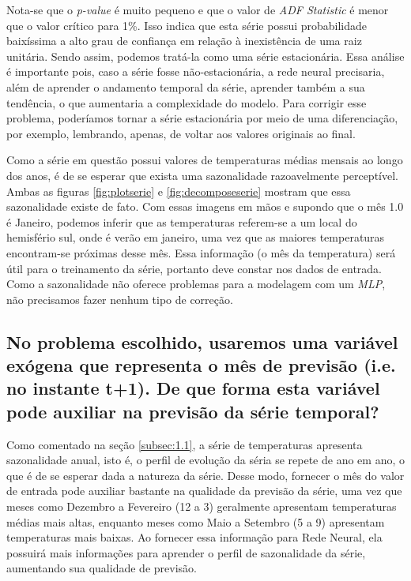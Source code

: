 \documentclass[12pt]{article}
\begin{document}
	Nota-se que o \textit{p-value} é muito pequeno e que o valor de \textit{ADF Statistic} é menor que o valor crítico para 1\%. Isso indica que esta série possui probabilidade baixíssima a alto grau de confiança em relação à inexistência de uma raiz unitária. Sendo assim, podemos tratá-la como uma série estacionária. Essa análise é importante pois, caso a série fosse não-estacionária, a rede neural precisaria, além de aprender o andamento temporal da série, aprender também a sua tendência, o que aumentaria a complexidade do modelo. Para corrigir esse problema, poderíamos tornar a série estacionária por meio de uma diferenciação, por exemplo, lembrando, apenas, de voltar aos valores originais ao final.
	
	Como a série em questão possui valores de temperaturas médias mensais ao longo dos anos, é de se esperar que exista uma sazonalidade razoavelmente perceptível. Ambas as figuras \ref{fig:plotserie} e \ref{fig:decomposeserie} mostram que essa sazonalidade existe de fato. Com essas imagens em mãos e supondo que o mês 1.0 é Janeiro, podemos inferir que as temperaturas referem-se a um local do hemisfério sul, onde é verão em janeiro, uma vez que as maiores temperaturas encontram-se próximas desse mês. Essa informação (o mês da temperatura) será útil para o treinamento da série, portanto deve constar nos dados de entrada. Como a sazonalidade não oferece problemas para a modelagem com um \textit{MLP}, não precisamos fazer nenhum tipo de correção.
	
	
	\subsection{No problema escolhido, usaremos uma variável exógena que representa	o mês de previsão (i.e. no instante t+1). De que forma esta variável pode auxiliar na previsão da série temporal?}
	
	Como comentado na seção \ref{subsec:1.1}, a série de temperaturas apresenta sazonalidade anual, isto é, o perfil de evolução da séria se repete de ano em ano, o que é de se esperar dada a natureza da série. Desse modo, fornecer o mês do valor de entrada pode auxiliar bastante na qualidade da previsão da série, uma vez que meses como Dezembro a Fevereiro (12 a 3) geralmente apresentam temperaturas médias mais altas, enquanto meses como Maio a Setembro (5 a 9) apresentam temperaturas mais baixas. Ao fornecer essa informação para Rede Neural, ela possuirá mais informações para aprender o perfil de sazonalidade da série, aumentando sua qualidade de previsão. 
	
\end{document}
